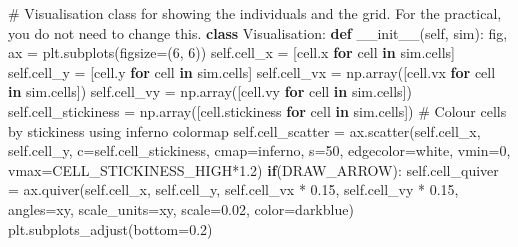\documentclass[
  letterpaper,
  DIV=11,
  numbers=noendperiod]{scrreprt}
\newenvironment{Shaded}{\begin{snugshade}}{\end{snugshade}}
\newcommand{\CommentTok}[1]{\textcolor[rgb]{0.37,0.37,0.37}{#1}}
\newcommand{\ControlFlowTok}[1]{\textcolor[rgb]{0.00,0.23,0.31}{\textbf{#1}}}
\newcommand{\DecValTok}[1]{\textcolor[rgb]{0.68,0.00,0.00}{#1}}
\newcommand{\FloatTok}[1]{\textcolor[rgb]{0.68,0.00,0.00}{#1}}
\newcommand{\FunctionTok}[1]{\textcolor[rgb]{0.28,0.35,0.67}{#1}}
\newcommand{\KeywordTok}[1]{\textcolor[rgb]{0.00,0.23,0.31}{\textbf{#1}}}
\newcommand{\NormalTok}[1]{\textcolor[rgb]{0.00,0.23,0.31}{#1}}
\newcommand{\OperatorTok}[1]{\textcolor[rgb]{0.37,0.37,0.37}{#1}}
\newcommand{\StringTok}[1]{\textcolor[rgb]{0.13,0.47,0.30}{#1}}
\newcommand{\VariableTok}[1]{\textcolor[rgb]{0.07,0.07,0.07}{#1}}
\theoremstyle{definition}
\theoremstyle{remark}
\begin{document}
\begin{tcolorbox}
\begin{Shaded}
\begin{Highlighting}[]
\CommentTok{\# Visualisation class for showing the individuals and the grid. For the practical, you do not need to change this. }
\KeywordTok{class}\NormalTok{ Visualisation:    }
    \KeywordTok{def} \FunctionTok{\_\_init\_\_}\NormalTok{(}\VariableTok{self}\NormalTok{, sim):}
\NormalTok{        fig, ax }\OperatorTok{=}\NormalTok{ plt.subplots(figsize}\OperatorTok{=}\NormalTok{(}\DecValTok{6}\NormalTok{, }\DecValTok{6}\NormalTok{))}
        \VariableTok{self}\NormalTok{.cell\_x }\OperatorTok{=}\NormalTok{ [cell.x }\ControlFlowTok{for}\NormalTok{ cell }\KeywordTok{in}\NormalTok{ sim.cells]}
        \VariableTok{self}\NormalTok{.cell\_y }\OperatorTok{=}\NormalTok{ [cell.y }\ControlFlowTok{for}\NormalTok{ cell }\KeywordTok{in}\NormalTok{ sim.cells]}
        \VariableTok{self}\NormalTok{.cell\_vx }\OperatorTok{=}\NormalTok{ np.array([cell.vx }\ControlFlowTok{for}\NormalTok{ cell }\KeywordTok{in}\NormalTok{ sim.cells])}
        \VariableTok{self}\NormalTok{.cell\_vy }\OperatorTok{=}\NormalTok{ np.array([cell.vy }\ControlFlowTok{for}\NormalTok{ cell }\KeywordTok{in}\NormalTok{ sim.cells])}
        \VariableTok{self}\NormalTok{.cell\_stickiness }\OperatorTok{=}\NormalTok{ np.array([cell.stickiness }\ControlFlowTok{for}\NormalTok{ cell }\KeywordTok{in}\NormalTok{ sim.cells])}
        \CommentTok{\# Colour cells by stickiness using inferno colormap}
        \VariableTok{self}\NormalTok{.cell\_scatter }\OperatorTok{=}\NormalTok{ ax.scatter(}\VariableTok{self}\NormalTok{.cell\_x, }\VariableTok{self}\NormalTok{.cell\_y, c}\OperatorTok{=}\VariableTok{self}\NormalTok{.cell\_stickiness, cmap}\OperatorTok{=}\StringTok{\textquotesingle{}inferno\textquotesingle{}}\NormalTok{, s}\OperatorTok{=}\DecValTok{50}\NormalTok{, edgecolor}\OperatorTok{=}\StringTok{\textquotesingle{}white\textquotesingle{}}\NormalTok{, vmin}\OperatorTok{=}\DecValTok{0}\NormalTok{, vmax}\OperatorTok{=}\NormalTok{CELL\_STICKINESS\_HIGH}\OperatorTok{*}\FloatTok{1.2}\NormalTok{)}
        \ControlFlowTok{if}\NormalTok{(DRAW\_ARROW): }\VariableTok{self}\NormalTok{.cell\_quiver }\OperatorTok{=}\NormalTok{ ax.quiver(}\VariableTok{self}\NormalTok{.cell\_x, }\VariableTok{self}\NormalTok{.cell\_y, }\VariableTok{self}\NormalTok{.cell\_vx }\OperatorTok{*} \FloatTok{0.15}\NormalTok{, }\VariableTok{self}\NormalTok{.cell\_vy }\OperatorTok{*} \FloatTok{0.15}\NormalTok{, angles}\OperatorTok{=}\StringTok{\textquotesingle{}xy\textquotesingle{}}\NormalTok{, scale\_units}\OperatorTok{=}\StringTok{\textquotesingle{}xy\textquotesingle{}}\NormalTok{, scale}\OperatorTok{=}\FloatTok{0.02}\NormalTok{, color}\OperatorTok{=}\StringTok{\textquotesingle{}darkblue\textquotesingle{}}\NormalTok{)}
\NormalTok{        plt.subplots\_adjust(bottom}\OperatorTok{=}\FloatTok{0.2}\NormalTok{)}


\end{Highlighting}
\end{Shaded}
\end{tcolorbox}
\end{document}
